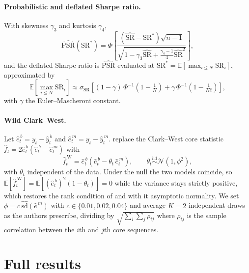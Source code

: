 \documentclass{article}
\theoremstyle{plain}
\theoremstyle{definition}
\begin{document}
\paragraph{Probabilistic and deflated Sharpe ratio.} With skewness $\gamma_3$ and
kurtosis $\gamma_4$,
%
\begin{equation}
  \widehat{\mathrm{PSR}}(\mathrm{SR}^{\ast}) = \Phi\!\left[
  \frac{(\widehat{\mathrm{SR}} - \mathrm{SR}^{\ast})\sqrt{n-1}}
  {\sqrt{1 - \gamma_3 \widehat{\mathrm{SR}}
  + \frac{\gamma_4 - 1}{4}\widehat{\mathrm{SR}}^{2}}}\right],
\end{equation}
%
and the deflated Sharpe ratio is $\widehat{\mathrm{PSR}}$ evaluated at
$\mathrm{SR}^{\ast} = \mathbb{E}[\max_{i \le N}\mathrm{SR}_i]$, approximated by
%
\begin{equation}
  \mathbb{E}\!\left[\max_{i \le N} \mathrm{SR}_i\right] \approx
  \sigma_{\mathrm{SR}}\!\left[(1-\gamma)\,\Phi^{-1}\!\left(1 - \tfrac{1}{N}\right)
  + \gamma\,\Phi^{-1}\!\left(1 - \tfrac{1}{Ne}\right)\right],
\end{equation}
%
with $\gamma$ the Euler--Mascheroni constant.

\paragraph{Wild Clark--West.} Let $\hat e^{\,b}_t = y_t - \hat y^{\,b}_t$ and
$\hat e^{\,m}_t = y_t - \hat y^{\,m}_t$. \citet{pincheira2021} replace the
Clark--West core statistic $\hat f_t = 2\hat e^{\,b}_t(\hat e^{\,b}_t - \hat
e^{\,m}_t)$ with
%
\begin{equation}
  \hat f^{\,\mathrm{W}}_t
  = \hat e^{\,b}_t\!\left(\hat e^{\,b}_t - \theta_t\, \hat e^{\,m}_t\right),
  \qquad
  \theta_t \stackrel{\text{iid}}{\sim} \mathcal{N}(1, \phi^2),
  \label{eq:wcw}
\end{equation}
%
with $\theta_t$ independent of the data. Under the null the two models coincide,
so $\mathbb{E}[\hat f^{\,\mathrm{W}}_t] = \mathbb{E}[(\hat e^{\,b}_t)^2
(1-\theta_t)] = 0$ while the variance stays strictly positive, which restores the
rank condition of \citet{west1996} and with it asymptotic normality. We set
$\phi = c\,\widehat{\mathrm{sd}}(\hat e^{\,m})$ with $c \in \{0.01, 0.02, 0.04\}$
and average $K = 2$ independent draws as the authors prescribe, dividing by
$\sqrt{\sum_i\sum_j \rho_{ij}}$ where $\rho_{ij}$ is the sample correlation
between the $i$th and $j$th core sequences.

\section{Full results}
\end{document}
